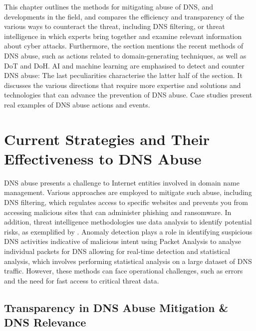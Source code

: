 This chapter outlines the methods for mitigating abuse of DNS, and developments in the field, and compares the efficiency and transparency of the various ways to counteract the threat, including DNS filtering, or threat intelligence in which experts bring together and examine relevant information about cyber attacks. Furthermore, the section mentions the recent methods of DNS abuse, such as actions related to domain-generating techniques, as well as DoT and DoH. AI and machine learning are emphasised to detect and counter DNS abuse: The last peculiarities characterise the latter half of the section. It discusses the various directions that require more expertise and solutions and technologies that can advance the prevention of DNS abuse. Case studies present real examples of DNS abuse actions and events.




\section{Current Strategies and Their Effectiveness to DNS Abuse}


DNS abuse presents a challenge to Internet entities involved in domain name management. Various approaches are employed to mitigate such abuse, including DNS filtering, which regulates access to specific websites and prevents you from accessing malicious sites that can administer phishing and ransomware. In addition, threat intelligence methodologies use data analysis to identify potential risks, as exemplified by \cite{schmid2021thirty}. Anomaly detection plays a role in identifying suspicious DNS activities indicative of malicious intent using Packet Analysis to analyse individual packets for DNS allowing for real-time detection and statistical analysis, which involves performing statistical analysis on a large dataset of DNS traffic. However, these methods can face operational challenges, such as errors and the need for fast access to critical threat data. 

\subsection{Transparency in DNS Abuse Mitigation \& DNS Relevance}

